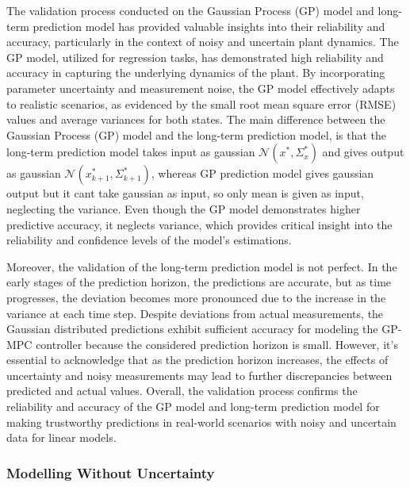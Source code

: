 The validation process conducted on the Gaussian Process (GP) model and long-term prediction model has provided valuable insights into their reliability and accuracy, particularly in the context of noisy and uncertain plant dynamics. The GP model, utilized for regression tasks, has demonstrated high reliability and accuracy in capturing the underlying dynamics of the plant. By incorporating parameter uncertainty and measurement noise, the GP model effectively adapts to realistic scenarios, as evidenced by the small root mean square error (RMSE) values and average variances for both states. The main difference between the Gaussian Process (GP) model and the long-term prediction model, is that the long-term prediction model takes input as gaussian \( \mathcal{N}( x^*, \Sigma_x^* ) \) and gives output as gaussian \( \mathcal{N}( x^*_{k+1}, \Sigma^*_{k+1} ) \), whereas GP prediction model gives gaussian output but it cant take gaussian as input, so only mean is given as input, neglecting the variance. Even though the GP model demonstrates higher predictive accuracy, it neglects variance, which provides critical insight into the reliability and confidence levels of the model's estimations.

Moreover, the validation of the long-term prediction model is not perfect. In the early stages of the prediction horizon, the predictions are accurate, but as time progresses, the deviation becomes more pronounced due to the increase in the variance at each time step. Despite deviations from actual measurements, the Gaussian distributed predictions exhibit sufficient accuracy for modeling the GP-MPC controller because the considered prediction horizon is small. However, it's essential to acknowledge that as the prediction horizon increases, the effects of uncertainty and noisy measurements may lead to further discrepancies between predicted and actual values. Overall, the validation process confirms the reliability and accuracy of the GP model and long-term prediction model for making trustworthy predictions in real-world scenarios with noisy and uncertain data for linear models. 





\subsubsection{Modelling Without Uncertainty}  

